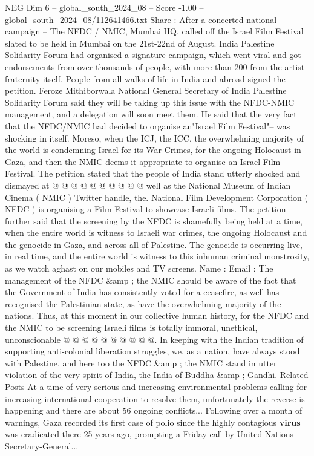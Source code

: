 \begin{textsample}{NEG Dim 6 – global\_south\_2024\_08 – Score -1.00 – global\_south\_2024\_08/112641466.txt}  \label{ex:f6_neg_062}
Share : After a concerted national campaign -- The NFDC / NMIC, Mumbai HQ, called off the Israel Film Festival slated to be held in Mumbai on the 21st-22nd of August.
India Palestine Solidarity Forum had organised a signature campaign, which went viral and got endorsements from over thousands of people, with more than 200 from the artist fraternity itself.
People from all walks of life in India and abroad signed the petition.
Feroze Mithiborwala National General Secretary of India Palestine Solidarity Forum said they will be taking up this issue with the NFDC-NMIC management, and a delegation will soon meet them.
He said that the very fact that the NFDC/NMIC had decided to organise an"Israel Film Festival"-- was shocking in itself.
Moreso, when the ICJ, the ICC, the overwhelming majority of the world is condemning Israel for its War Crimes, for the ongoing Holocaust in Gaza, and then the NMIC deems it appropriate to organise an Israel Film Festival.
The petition stated that the people of India stand utterly shocked and dismayed at @ @ @ @ @ @ @ @ @ @ well as the National Museum of Indian Cinema ( NMIC ) Twitter handle, the.
National Film Development Corporation ( NFDC ) is organising a Film Festival to showcase Israeli films.
The petition further said that the screening by the NFDC is shamefully being held at a time, when the entire world is witness to Israeli war crimes, the ongoing Holocaust and the genocide in Gaza, and across all of Palestine.
The genocide is occurring live, in real time, and the entire world is witness to this inhuman criminal monstrosity, as we watch aghast on our mobiles and TV screens.
Name : Email : The management of the NFDC \&amp ; the NMIC should be aware of the fact that the Government of India has consistently voted for a ceasefire, as well has recognised the Palestinian state, as have the overwhelming majority of the nations.
Thus, at this moment in our collective human history, for the NFDC and the NMIC to be screening Israeli films is totally immoral, unethical, unconscionable @ @ @ @ @ @ @ @ @ @.
In keeping with the Indian tradition of supporting anti-colonial liberation struggles, we, as a nation, have always stood with Palestine, and here too the NFDC \&amp ; the NMIC stand in utter violation of the very spirit of India, the India of Buddha \&amp ; Gandhi.
Related Posts At a time of very serious and increasing environmental problems calling for increasing international cooperation to resolve them, unfortunately the reverse is happening and there are about 56 ongoing conflicts...
Following over a month of warnings, Gaza recorded its first case of polio since the highly contagious \textbf{virus} was eradicated there 25 years ago, prompting a Friday call by United Nations Secretary-General...

\end{textsample}
